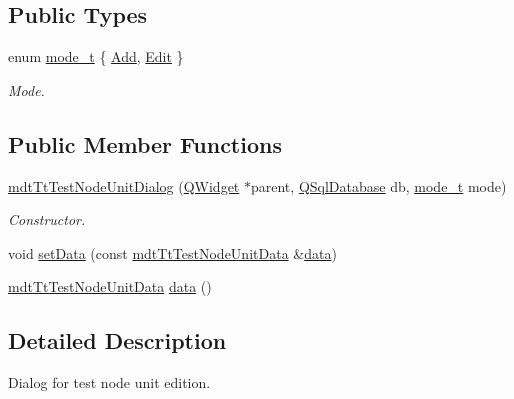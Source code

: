 \subsection*{Public Types}
\begin{DoxyCompactItemize}
\item 
enum \hyperlink{classmdt_tt_test_node_unit_dialog_a27aec8b26b20230fcf0054e2f2f5c18e}{mode\-\_\-t} \{ \hyperlink{classmdt_tt_test_node_unit_dialog_a27aec8b26b20230fcf0054e2f2f5c18ea2cbe738c7f02392a4958df04614f09bf}{Add}, 
\hyperlink{classmdt_tt_test_node_unit_dialog_a27aec8b26b20230fcf0054e2f2f5c18ea24f18a30dc0ef344be1955ba4438d525}{Edit}
 \}
\begin{DoxyCompactList}\small\item\em Mode. \end{DoxyCompactList}\end{DoxyCompactItemize}
\subsection*{Public Member Functions}
\begin{DoxyCompactItemize}
\item 
\hyperlink{classmdt_tt_test_node_unit_dialog_adfa9847e393a29d13d00a36c48923f47}{mdt\-Tt\-Test\-Node\-Unit\-Dialog} (\hyperlink{class_q_widget}{Q\-Widget} $\ast$parent, \hyperlink{class_q_sql_database}{Q\-Sql\-Database} db, \hyperlink{classmdt_tt_test_node_unit_dialog_a27aec8b26b20230fcf0054e2f2f5c18e}{mode\-\_\-t} mode)
\begin{DoxyCompactList}\small\item\em Constructor. \end{DoxyCompactList}\item 
void \hyperlink{classmdt_tt_test_node_unit_dialog_a1fe2ce1e5827220dda22cca8186c3fc4}{set\-Data} (const \hyperlink{classmdt_tt_test_node_unit_data}{mdt\-Tt\-Test\-Node\-Unit\-Data} \&\hyperlink{classmdt_tt_test_node_unit_dialog_a16b2edaaa868880357013c9875903662}{data})
\item 
\hyperlink{classmdt_tt_test_node_unit_data}{mdt\-Tt\-Test\-Node\-Unit\-Data} \hyperlink{classmdt_tt_test_node_unit_dialog_a16b2edaaa868880357013c9875903662}{data} ()
\end{DoxyCompactItemize}


\subsection{Detailed Description}
Dialog for test node unit edition. 

